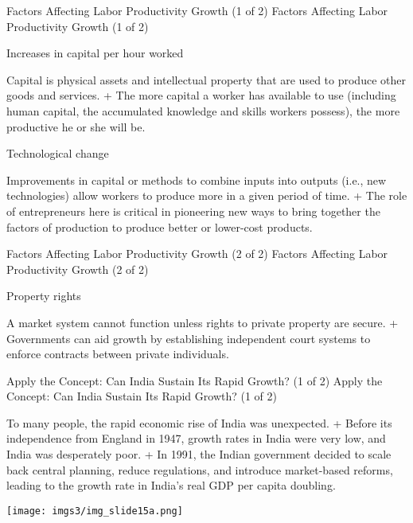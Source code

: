 \documentclass[
  12pt,
  ignorenonframetext,
]{beamer}
\begin{document}
\begin{frame}{Factors Affecting Labor Productivity Growth (1 of 2)}
\protect\hypertarget{factors-affecting-labor-productivity-growth-1-of-2}{}
Factors Affecting Labor Productivity Growth (1 of 2)

Increases in capital per hour worked

Capital is physical assets and intellectual property that are used to
produce other goods and services. + The more capital a worker has
available to use (including human capital, the accumulated knowledge and
skills workers possess), the more productive he or she will be.

Technological change

Improvements in capital or methods to combine inputs into outputs (i.e.,
new technologies) allow workers to produce more in a given period of
time. + The role of entrepreneurs here is critical in pioneering new
ways to bring together the factors of production to produce better or
lower-cost products.
\end{frame}

\begin{frame}{Factors Affecting Labor Productivity Growth (2 of 2)}
\protect\hypertarget{factors-affecting-labor-productivity-growth-2-of-2}{}
Factors Affecting Labor Productivity Growth (2 of 2)

Property rights

A market system cannot function unless rights to private property are
secure. + Governments can aid growth by establishing independent court
systems to enforce contracts between private individuals.
\end{frame}

\begin{frame}{Apply the Concept: Can India Sustain Its Rapid Growth? (1
of 2)}
\protect\hypertarget{apply-the-concept-can-india-sustain-its-rapid-growth-1-of-2}{}
Apply the Concept: Can India Sustain Its Rapid Growth? (1 of 2)

To many people, the rapid economic rise of India was unexpected. +
Before its independence from England in 1947, growth rates in India were
very low, and India was desperately poor. + In 1991, the Indian
government decided to scale back central planning, reduce regulations,
and introduce market-based reforms, leading to the growth rate in
India's real GDP per capita doubling.

\texttt{[image: imgs3/img\_slide15a.png]}
\end{frame}
\end{document}
